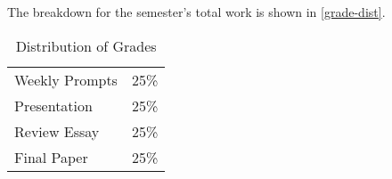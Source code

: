 \documentclass[titlepage]{article}
\newcommand\policy{../policy}
\begin{document}
The breakdown for the semester's total work is shown in
\autoref{grade-dist}.

\begin{table}[htbp]
  \centering
  {\lining
  \begin{tabular}{lr}
    \toprule
    Weekly Prompts & 25\% \\
    Presentation   & 25\% \\
    Review Essay   & 25\% \\
    Final Paper    & 25\% \\
    \bottomrule
  \end{tabular}}
  \caption{Distribution of Grades}
  \label{grade-dist}
\end{table}



\end{document}
